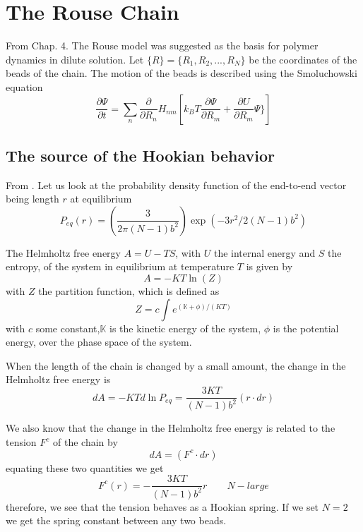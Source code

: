 \documentclass{report}
\begin{document}
\section{The Rouse Chain}\label{section_theRouseChain}
From \cite{doi1986theory} Chap. 4. The Rouse model was suggested as the basis for polymer dynamics in dilute solution. Let $\{R\}=\{R_1,R_2,...,R_N\}$ be the coordinates of the beads of the chain. The motion of the beads is described using the Smoluchowski equation
\begin{equation*}
\frac{\partial \Psi}{\partial t }=\sum_n \frac{\partial}{\partial R_n}H_{nm}\left[k_BT\frac{\partial \Psi}{\partial R_m}+\frac{\partial U}{\partial R_m}\Psi\}\right]
\end{equation*}

\subsection{The source of the Hookian behavior}\label{subsection_sourceOfTheHookianBehavior}
From \cite{bird1987dynamics}. Let us look at the probability density function of the end-to-end vector being length $r$ at equilibrium
\begin{equation*}
P_{eq}(r)= \left(\frac{3}{2\pi (N-1)b^2}\right)\exp(-3r^2/2(N-1)b^2)
\end{equation*}

 The Helmholtz free energy $A=U-TS$, with $U$ the internal energy and $S$ the entropy, of the system in equilibrium at temperature $T$ is given by 
\begin{equation*}
A=-KT\ln(Z)
\end{equation*}
with $Z$ the partition function, which is defined as 
\begin{equation*}
Z=c\int e^{(\mathbb{K+\phi})/(KT)}
\end{equation*}
with $c$ some constant,$\mathbb{K}$ is the kinetic energy of the system, $\mathbb{\phi}$ is the potential energy, over the phase space of the system. 

When the length of the chain is changed by a small amount, the change in the Helmholtz free energy is 
\begin{equation*}
dA=-KTd\ln{P_{eq}}=\frac{3KT}{(N-1)b^2}(r\cdot dr)
\end{equation*}

We also know that the change in the Helmholtz free energy is related to the tension $F^c$ of the chain by 
\begin{equation*}
dA=(F^c\cdot dr)
\end{equation*}
equating these two quantities we get 
\begin{equation*}
F^c(r) = -\frac{3KT}{(N-1)b^2}r	 \qquad N-large
\end{equation*}
therefore, we see that the tension behaves as a Hookian spring. If we set $N=2$ we get the spring constant between any two beads.
\end{document}
